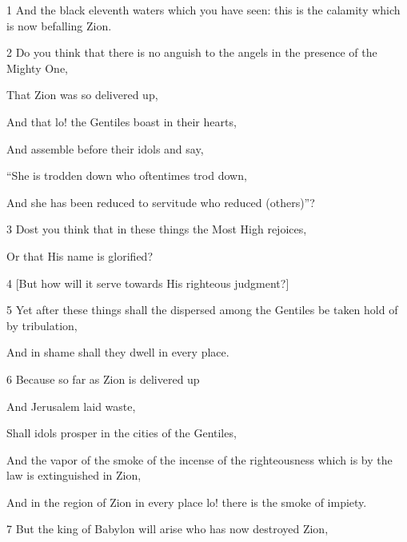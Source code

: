\par 1 And the black eleventh waters which you have seen: this is the calamity which is now befalling Zion.

\par 2 Do you think that there is no anguish to the angels in the presence of the Mighty One,

\par That Zion was so delivered up,

\par And that lo! the Gentiles boast in their hearts,

\par And assemble before their idols and say,

\par “She is trodden down who oftentimes trod down,

\par And she has been reduced to servitude who reduced (others)”?

\par 3 Dost you think that in these things the Most High rejoices,

\par Or that His name is glorified?

\par 4 [But how will it serve towards His righteous judgment?]

\par 5 Yet after these things shall the dispersed among the Gentiles be taken hold of by tribulation,

\par And in shame shall they dwell in every place.

\par 6 Because so far as Zion is delivered up

\par And Jerusalem laid waste,

\par Shall idols prosper in the cities of the Gentiles,

\par And the vapor of the smoke of the incense of the righteousness which is by the law is extinguished in Zion,

\par And in the region of Zion in every place lo! there is the smoke of impiety.

\par 7 But the king of Babylon will arise who has now destroyed Zion,

